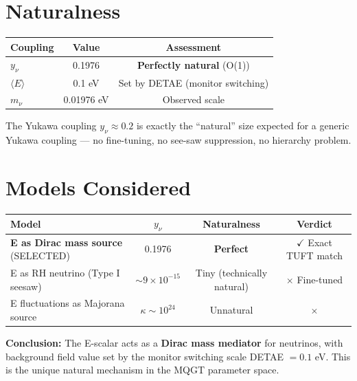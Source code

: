 \documentclass[11pt]{article}
\begin{document}
\section{Naturalness}
\begin{table}[ht]
\centering
\begin{tabular}{lcc}
\toprule
Coupling & Value & Assessment \\
\midrule
$y_\nu$ & 0.1976 & \textbf{Perfectly natural} (O(1)) \\
$\langle E \rangle$ & 0.1 eV & Set by DETAE (monitor switching) \\
$m_\nu$ & 0.01976 eV & Observed scale \\
\bottomrule
\end{tabular}
\end{table}
The Yukawa coupling $y_\nu \approx 0.2$ is exactly the ``natural'' size expected for a generic Yukawa coupling --- no fine-tuning, no see-saw suppression, no hierarchy problem.

\section{Models Considered}
\begin{table}[ht]
\centering
\begin{tabular}{lccc}
\toprule
Model & $y_\nu$ & Naturalness & Verdict \\
\midrule
\textbf{E as Dirac mass source} (SELECTED) & 0.1976 & \textbf{Perfect} & $\checkmark$ Exact TUFT match \\
E as RH neutrino (Type I seesaw) & $\sim 9\times 10^{-15}$ & Tiny (technically natural) & $\times$ Fine-tuned \\
E fluctuations as Majorana source & $\kappa \sim 10^{24}$ & Unnatural & $\times$ \\
\bottomrule
\end{tabular}
\end{table}

\textbf{Conclusion:} The E-scalar acts as a \textbf{Dirac mass mediator} for neutrinos, with background field value set by the monitor switching scale DETAE $= 0.1$ eV. This is the unique natural mechanism in the MQGT parameter space.
\end{document}
